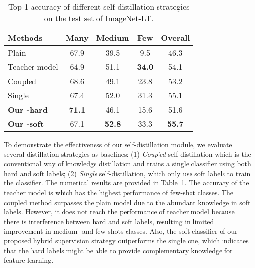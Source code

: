 \documentclass[10pt,twocolumn,letterpaper]{article}
\begin{document}
\begin{table}[t]
\centering
\footnotesize
\setlength{\tabcolsep}{8pt}
\vspace{1em}
\begin{tabular}{l|cccc}
\hline
Methods     & Many          & Medium        & Few           & Overall       \\ \hline\hline
Plain           &       67.9         &    39.5         &        9.5        &     46.3           \\
Teacher model    & 64.9          & 51.1          & \textbf{34.0} & 54.1          \\
Coupled     & 68.6          & 49.1          & 23.8          & 53.2          \\
Single     & 67.4          & 52.0          & 31.3          & 55.1          \\
\textbf{Our \uppercase\expandafter{\romannumeral3}-hard} & \textbf{71.1} & 46.1          & 15.6          & 51.6          \\
\textbf{Our \uppercase\expandafter{\romannumeral3}-soft} & 67.1          & \textbf{52.8} & 33.3          & \textbf{55.7} \\ \hline
\end{tabular}
\vspace{1em}
\caption{Top-1 accuracy of different self-distillation strategies on the test set of ImageNet-LT.}
\vspace{-1em}
\label{tab:distent}
\end{table}

To demonstrate the effectiveness of our self-distillation module, we evaluate several distillation strategies as baselines: (1) \textit{Coupled} self-distillation which is the conventional way of knowledge distillation and trains a single classifier using both hard and soft labels; (2) \textit{Single} self-distillation, which only use soft labels to train the classifier. The numerical results are provided in Table~\ref{tab:distent}. The accuracy of the teacher model is  which has the highest performance of few-shot classes. The coupled method surpasses the plain model due to the abundant knowledge in soft labels. However, it does not reach the performance of teacher model because there is interference between hard and soft labels, resulting in limited improvement in medium- and few-shots classes. Also, the soft classifier of our proposed hybrid supervision strategy outperforms the single one, which indicates that the hard labels might be able to provide complementary knowledge for feature learning.
\end{document}
